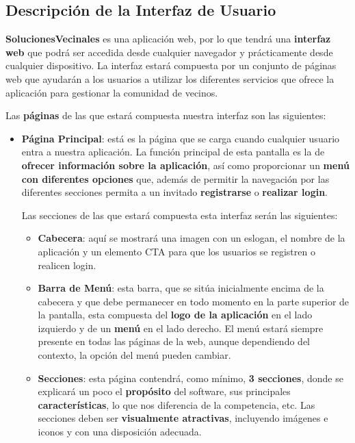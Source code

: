 \begin{appendices}
	
\section{Descripción de la Interfaz de Usuario}
\label{sec:apenA}
\textbf{SolucionesVecinales} es una aplicación web, por lo que tendrá una \textbf{interfaz web} que podrá ser accedida desde cualquier navegador y prácticamente desde cualquier dispositivo. La interfaz estará compuesta por un conjunto de páginas web que ayudarán a los usuarios a utilizar los diferentes servicios que ofrece la aplicación para gestionar la comunidad de vecinos. 

Las \textbf{páginas} de las que estará compuesta nuestra interfaz son las siguientes:

\begin{itemize}
	\item \textbf{Página Principal}: está es la página que se carga cuando cualquier usuario entra a nuestra aplicación. La función principal de esta pantalla es la de \textbf{ofrecer información sobre la aplicación}, así como proporcionar un\textbf{ menú con diferentes opciones} que, además de permitir la navegación por las diferentes secciones permita a un invitado \textbf{registrarse} o \textbf{realizar \gls{login}}.
	
	Las secciones de las que estará compuesta esta interfaz serán las siguientes:
	
	\begin{itemize}
		\item \textbf{Cabecera}: aquí se mostrará una imagen con un eslogan, el nombre de la aplicación y un elemento \gls{CTA} para que los usuarios se registren o realicen login.
		
		\item \textbf{Barra de Menú}: esta barra, que se sitúa inicialmente encima de la cabecera y que debe permanecer en todo momento en la parte superior de la pantalla, esta compuesta del \textbf{logo de la aplicación} en el lado izquierdo y de un \textbf{menú} en el lado derecho. El menú estará siempre presente en todas las páginas de la web, aunque dependiendo del contexto, la opción del menú pueden cambiar.
		
		\item \textbf{Secciones}: esta página contendrá, como mínimo, \textbf{3 secciones}, donde se explicará un poco el \textbf{propósito} del software, sus principales \textbf{características}, lo que nos diferencia de la competencia, etc. Las secciones deben ser \textbf{visualmente atractivas}, incluyendo imágenes e iconos y con una disposición adecuada. 
		

\end{itemize}
\end{itemize}
\end{appendices}
